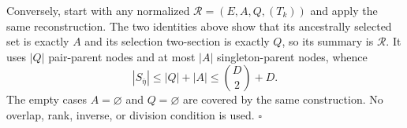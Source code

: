 Conversely, start with any normalized \(\mathcal R=(E,A,Q,(T_k))\) and apply the same reconstruction.  The two identities above show that its ancestrally selected set is exactly \(A\) and its selection two-section is exactly \(Q\), so its summary is \(\mathcal R\).  It uses \(|Q|\) pair-parent nodes and at most \(|A|\) singleton-parent nodes, whence
\[
|S_{\bar\eta}|\le |Q|+|A|\le\binom D2+D.
\]
The empty cases \(A=\varnothing\) and \(Q=\varnothing\) are covered by the same construction.  No overlap, rank, inverse, or division condition is used. \(\square\)